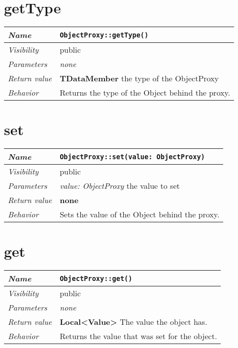  \section{getType}
\begin{longtable}{p{3cm} @{\hskip 1cm} p{12cm}}
 \hline
\textit{Name} & \texttt{ObjectProxy::getType()}\\
\hline
 \textit{Visibility} & public\\
\hline
\textit{Parameters} & \textit{none}\\
\hline
\textit{Return value} & \textbf{TDataMember} the type of the ObjectProxy\\
  \hline
 \textit{Behavior} & Returns the type of the Object behind the proxy.\\
\hline
\end{longtable} \pagebreak
 \section{set}
\begin{longtable}{p{3cm} @{\hskip 1cm} p{12cm}}
 \hline
\textit{Name} & \texttt{ObjectProxy::set(value: ObjectProxy)}\\
\hline
 \textit{Visibility} & public\\
\hline
\textit{Parameters} & \textit{value: ObjectProxy} the value to set\\
\hline
\textit{Return value} & \textbf{none}\\
  \hline
 \textit{Behavior} & Sets the value of the Object behind the proxy.\\
\hline
\end{longtable} 
 \section{get}
\begin{longtable}{p{3cm} @{\hskip 1cm} p{12cm}}
 \hline
\textit{Name} & \texttt{ObjectProxy::get()}\\
\hline
 \textit{Visibility} & public\\
\hline
\textit{Parameters} & \textit{none}\\
\hline
\textit{Return value} & \textbf{Local<Value>} The value the object has.\\
  \hline
 \textit{Behavior} & Returns the value that was set for the object.\\
\hline
\end{longtable} 
